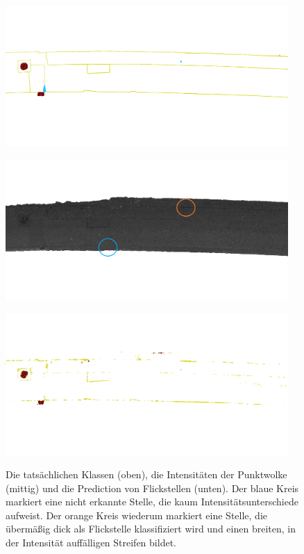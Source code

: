 \begin{figure}
    {\includegraphics[width=0.96\textwidth]{graphics/eval_left_ground_truth}}
    \par\smallskip
    {\includegraphics[width=0.96\textwidth]{graphics/eval_left_no_classes_circles}}
    \par\smallskip
    {\includegraphics[width=0.96\textwidth]{graphics/eval_left_prediction}}
    \caption{Die tatsächlichen Klassen (oben), die Intensitäten der Punktwolke (mittig) und die Prediction von Flickstellen (unten). Der blaue Kreis markiert eine nicht erkannte Stelle, die kaum Intensitätsunterschiede aufweist. Der orange Kreis wiederum markiert eine Stelle, die übermäßig dick als Flickstelle klassifiziert wird und einen breiten, in der Intensität auffälligen Streifen bildet.}
    \label{fig:cmp_flickstellen}
\end{figure}

